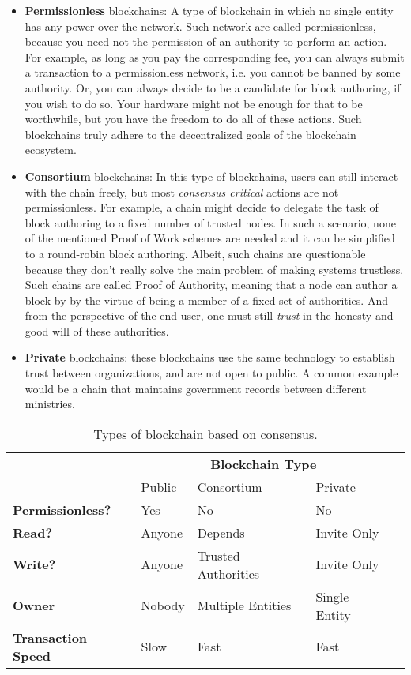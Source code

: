 \begin{itemize}
	\item \textbf{Permissionless} blockchains: A type of blockchain in which no single entity has
	any power over the network. Such network are called permissionless, because you need not the
	permission of an authority to perform an action. For example, as long as you pay the
	corresponding fee, you can always submit a transaction to a permissionless network, i.e. you
	cannot be banned by some authority. Or, you can always decide to be a candidate for block
	authoring, if you wish to do so. Your hardware might not be enough for that to be worthwhile,
	but you have the freedom to do all of these actions. Such blockchains truly adhere to the
	decentralized goals of the blockchain ecosystem.
	\item \textbf{Consortium} blockchains: In this type of blockchains, users can still interact
	with the chain freely, but most \textit{consensus critical} actions are not permissionless. For
	example, a chain might decide to delegate the task of block authoring to a fixed number of
	trusted nodes. In such a scenario, none of the mentioned Proof of Work schemes are needed and it
	can be simplified to a round-robin block authoring. Albeit, such chains are questionable because
	they don't really solve the main problem of making systems trustless. Such chains are called
	Proof of Authority, meaning that a node can author a block by by the virtue of being a member of
	a fixed set of authorities. And from the perspective of the end-user, one must still
	\textit{trust} in the honesty and good will of these authorities.
	\item \textbf{Private} blockchains: these blockchains use the same technology to establish trust
	between organizations, and are not open to public. A common example would be a chain that
	maintains government records between different ministries.
\end{itemize}

\begin{table}[]
	\caption{Types of blockchain based on consensus.}
	\label{table:blockchain_types}
	\begin{tabular}{lllll}
													& \multicolumn{3}{c}{\textbf{Blockchain Type}} &
													\\
													& Public & Consortium          & Private       &
	\\ \cline{1-4} \multicolumn{1}{l|}{\textbf{Permissionless?}}   & Yes    & No                  &
	No            &  \\
	\multicolumn{1}{l|}{\textbf{Read?}}             & Anyone & Depends             & Invite Only   &
	\\
	\multicolumn{1}{l|}{\textbf{Write?}}            & Anyone & Trusted Authorities & Invite Only   &
	\\
	\multicolumn{1}{l|}{\textbf{Owner}}             & Nobody & Multiple Entities   & Single Entity &
	\\
	\multicolumn{1}{l|}{\textbf{Transaction Speed}} & Slow   & Fast                & Fast          &
	\end{tabular}
\end{table}


